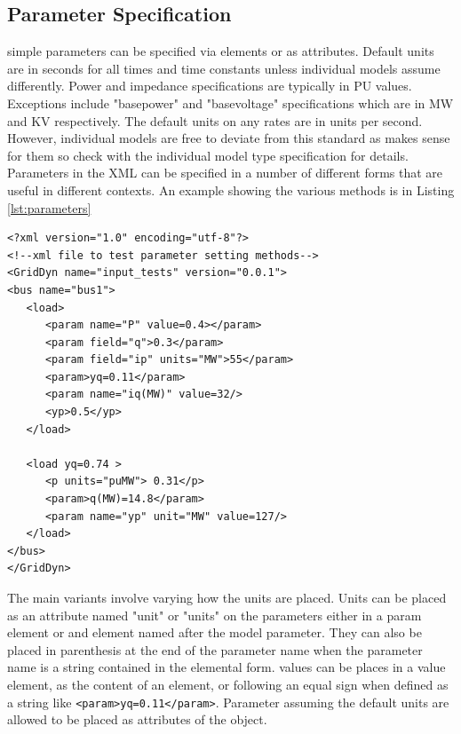 \documentclass[12pt]{article} %
\begin{document}
\subsection{Parameter Specification}
simple parameters can be specified via elements or as attributes.  Default units are in seconds for all times and time constants unless individual models assume differently.  Power and impedance specifications are typically in PU values.  Exceptions include "basepower" and "basevoltage" specifications which are in MW and KV respectively. The default units on any rates are in units per second.  However, individual models are free to deviate from this standard as makes sense for them so check with the individual model type specification for details.  Parameters in the XML can be specified in a number of different forms that are useful in different contexts.  An example showing the various methods is in Listing \ref{lst:parameters}
\begin{lstlisting}[caption={XML file for testing parameter input methods},label={lst:parameters}]
<?xml version="1.0" encoding="utf-8"?>
<!--xml file to test parameter setting methods-->
<GridDyn name="input_tests" version="0.0.1">
<bus name="bus1">
   <load>
      <param name="P" value=0.4></param>
      <param field="q">0.3</param>
      <param field="ip" units="MW">55</param>
      <param>yq=0.11</param>
      <param name="iq(MW)" value=32/>
      <yp>0.5</yp>
   </load>

   <load yq=0.74 >
      <p units="puMW"> 0.31</p>
      <param>q(MW)=14.8</param>
      <param name="yp" unit="MW" value=127/>
   </load>
</bus>
</GridDyn>  
\end{lstlisting}
The main variants involve varying how the units are placed.  Units can be placed as an attribute named "unit" or "units" on the parameters either in a param element or and element named after the model parameter.  They can also be placed in parenthesis at the end of the parameter name when the parameter name is a string contained in the elemental form.  values can be places in a value element, as the content of an element, or following an equal sign when defined as a string like  {\tt  <param>yq=0.11</param>}.  Parameter assuming the default units are allowed to be placed as attributes of the object.  
\end{document}
